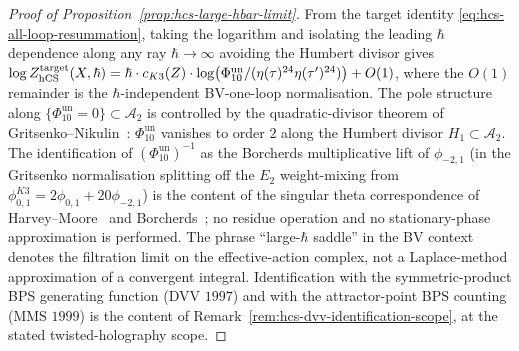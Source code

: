 \begin{proof}[Proof of Proposition~\ref{prop:hcs-large-hbar-limit}]
From the target identity \eqref{eq:hcs-all-loop-resummation}, taking
the logarithm and isolating the leading $\hbar$ dependence along any ray
$\hbar \to \infty$ avoiding the Humbert divisor gives
$\log Z_{\mathrm{hCS}}^{\mathrm{target}}(X, \hbar) =
\hbar \cdot c_{K3}(Z) \cdot
\log\bigl(\Phi_{10}^{\mathrm{un}}/(\eta(\tau)^{24}\eta(\tau')^{24})\bigr) + O(1)$,
where the $O(1)$ remainder is the $\hbar$-independent BV-one-loop
normalisation. The pole structure along $\{\Phi_{10}^{\mathrm{un}}=0\}\subset
\mathcal{A}_2$ is controlled by the quadratic-divisor theorem of
Gritsenko--Nikulin~\cite{GritsenkoNikulin1998}:
$\Phi_{10}^{\mathrm{un}}$ vanishes to order $2$ along the Humbert divisor
$H_{1}\subset\mathcal A_{2}$.
The identification of $(\Phi_{10}^{\mathrm{un}})^{-1}$ as the Borcherds multiplicative
lift of $\phi_{-2,1}$ (in the Gritsenko normalisation splitting off
the $E_2$ weight-mixing
from $\phi_{0,1}^{K3} = 2\phi_{0,1} + 20\phi_{-2,1}$) is
the content of the singular theta correspondence of
Harvey--Moore~\cite{HarveyMoore1996} and
Borcherds~\cite{Borcherds1998}; no residue operation and no
stationary-phase approximation is performed. The phrase
``large-$\hbar$ saddle'' in the BV context denotes the filtration
limit on the effective-action complex, not a Laplace-method
approximation of a convergent integral. Identification with the
symmetric-product BPS generating function (DVV $1997$) and with the
attractor-point BPS counting (MMS $1999$) is the content of
Remark~\ref{rem:hcs-dvv-identification-scope}, at the stated
twisted-holography scope.
\end{proof}

